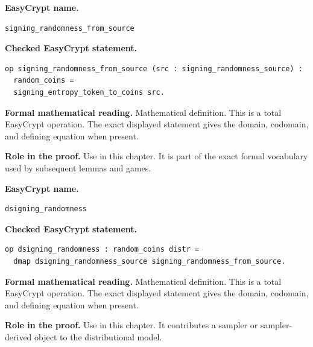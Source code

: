 \begin{formaldefinition}
\noindent\textbf{EasyCrypt name.}
\begin{lstlisting}[language=EasyCrypt,basicstyle=\ttfamily\scriptsize]
signing_randomness_from_source
\end{lstlisting}
\noindent\textbf{Checked EasyCrypt statement.}
\begin{lstlisting}[language=EasyCrypt,basicstyle=\ttfamily\scriptsize]
op signing_randomness_from_source (src : signing_randomness_source) :
  random_coins =
  signing_entropy_token_to_coins src.
\end{lstlisting}
\noindent\textbf{Formal mathematical reading.}
Mathematical definition. This is a total EasyCrypt operation.  The exact displayed statement gives the domain, codomain, and defining equation when present.

\noindent\textbf{Role in the proof.}
Use in this chapter. It is part of the exact formal vocabulary used by subsequent lemmas and games.

\end{formaldefinition}

\begin{formaldefinition}
\noindent\textbf{EasyCrypt name.}
\begin{lstlisting}[language=EasyCrypt,basicstyle=\ttfamily\scriptsize]
dsigning_randomness
\end{lstlisting}
\noindent\textbf{Checked EasyCrypt statement.}
\begin{lstlisting}[language=EasyCrypt,basicstyle=\ttfamily\scriptsize]
op dsigning_randomness : random_coins distr =
  dmap dsigning_randomness_source signing_randomness_from_source.
\end{lstlisting}
\noindent\textbf{Formal mathematical reading.}
Mathematical definition. This is a total EasyCrypt operation.  The exact displayed statement gives the domain, codomain, and defining equation when present.

\noindent\textbf{Role in the proof.}
Use in this chapter. It contributes a sampler or sampler-derived object to the distributional model.

\end{formaldefinition}

